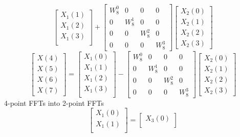 \documentclass[journal,12pt,twocolumn]{IEEEtran}
\renewcommand\thesection{\arabic{section}}
\begin{document}
\begin{enumerate}[label=\thesection.\arabic*.,ref=\thesection.\theenumi]
\begin{equation}
\begin{bmatrix}
	X_{1}(1)\\ 
	X_{1}(2)\\
	X_{1}(3)\\
\end{bmatrix}
+
\begin{bmatrix}
	W^{0}_{8} & 0 & 0 & 0\\
	0 & W^{1}_{8} & 0 & 0\\
	0 & 0 & W^{2}_{8} & 0\\
	0 & 0 & 0 & W^{3}_{8}
\end{bmatrix}
\begin{bmatrix}
	X_{2}(0) \\ 
	X_{2}(1) \\ 
	X_{2}(2) \\
	X_{2}(3)
\end{bmatrix}
\label{eq:8-low}
\end{equation}
\begin{equation}
\begin{bmatrix}
X(4) \\ 
X(5) \\ 
X(6) \\ 
X(7)
\end{bmatrix}
=
\begin{bmatrix}
X_{1}(0) \\ 
X_{1}(1)\\ 
X_{1}(2)\\
X_{1}(3)\\
\end{bmatrix}
-
\begin{bmatrix}
W^{0}_{8} & 0 & 0 & 0\\
0 & W^{1}_{8} & 0 & 0\\
0 & 0 & W^{2}_{8} & 0\\
0 & 0 & 0 & W^{3}_{8}
\end{bmatrix}
\begin{bmatrix}
X_{2}(0) \\ 
X_{2}(1) \\ 
X_{2}(2) \\
X_{2}(3)
\end{bmatrix}
\label{eq:8-high}
\end{equation}
4-point FFTs into 2-point FFTs
\begin{equation}
\begin{bmatrix}
X_{1}(0) \\ 
X_{1}(1)\\ 
\end{bmatrix}
=
\begin{bmatrix}
X_{3}(0) \\ 

\end{bmatrix}
\end{equation}
\end{enumerate}
\end{document}

